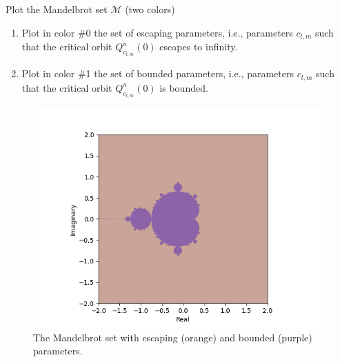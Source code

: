 \documentclass[11pt]{article}
\begin{document}
\hypertarget{2}{%
\section{}\label{2}}Plot the Mandelbrot set $\mathcal{M}$ (two colors) 
\begin{enumerate}[label=(\alph{*})]
    \item Plot in color \#0 the set of escaping parameters, i.e., parameters $c_{l,m}$ such that the critical orbit $Q^{n}_{c_{l,m}}(0)$ escapes to infinity.
    \item Plot in color \#1 the set of bounded parameters, i.e., parameters $c_{l,m}$ such that the critical orbit $Q^{n}_{c_{l,m}}(0)$ is bounded.
\end{enumerate}

\begin{figure}[ht]
    \centering
    \includegraphics{mandelbrot_2.png}
    \caption{The Mandelbrot set with escaping (orange) and bounded (purple) parameters.}
    \label{fig:mandelbrot_2}
\end{figure}


\end{document}
